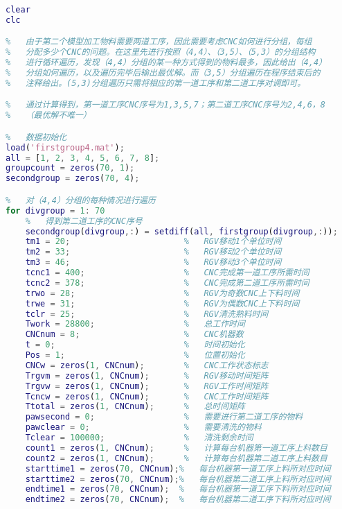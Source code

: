 \documentclass[no-math,withoutpreface,bwprint]{cumcmthesis} %
\numberwithin{equation}{section}
\numberwithin{figure}{section}
\numberwithin{table}{section}
\begin{document}
\begin{lstlisting}[language=matlab]
%   MATLAB初始化
clear
clc

%   由于第二个模型加工物料需要两道工序，因此需要考虑CNC如何进行分组，每组
%   分配多少个CNC的问题。在这里先进行按照（4,4）、（3,5）、（5,3）的分组结构
%   进行循环遍历，发现（4,4）分组的某一种方式得到的物料最多，因此给出（4,4）
%   分组如何遍历，以及遍历完毕后输出最优解。而（3,5）分组遍历在程序结束后的
%   注释给出。(5,3)分组遍历只需将相应的第一道工序和第二道工序对调即可。

%   通过计算得到，第一道工序CNC序号为1,3,5,7；第二道工序CNC序号为2,4,6，8
%   （最优解不唯一）

%   数据初始化
load('firstgroup4.mat');
all = [1, 2, 3, 4, 5, 6, 7, 8];
groupcount = zeros(70, 1);
secondgroup = zeros(70, 4);

%   对（4,4）分组的每种情况进行遍历
for divgroup = 1: 70
    %   得到第二道工序的CNC序号
    secondgroup(divgroup,:) = setdiff(all, firstgroup(divgroup,:));
    tm1 = 20;                       %   RGV移动1个单位时间
    tm2 = 33;                       %   RGV移动2个单位时间
    tm3 = 46;                       %   RGV移动3个单位时间
    tcnc1 = 400;                    %   CNC完成第一道工序所需时间
    tcnc2 = 378;                    %   CNC完成第二道工序所需时间
    trwo = 28;                      %   RGV为奇数CNC上下料时间
    trwe = 31;                      %   RGV为偶数CNC上下料时间
    tclr = 25;                      %   RGV清洗熟料时间
    Twork = 28800;                  %   总工作时间
    CNCnum = 8;                     %   CNC机器数
    t = 0;                          %   时间初始化
    Pos = 1;                        %   位置初始化
    CNCw = zeros(1, CNCnum);        %   CNC工作状态标志
    Trgvm = zeros(1, CNCnum);      	%   RGV移动时间矩阵
    Trgvw = zeros(1, CNCnum);       %   RGV工作时间矩阵
    Tcncw = zeros(1, CNCnum);       %   CNC工作时间矩阵
    Ttotal = zeros(1, CNCnum);      %   总时间矩阵
    pawsecond = 0;                  %   需要进行第二道工序的物料
    pawclear = 0;                   %   需要清洗的物料
    Tclear = 100000;                %   清洗剩余时间
    count1 = zeros(1, CNCnum);      %   计算每台机器第一道工序上料数目
    count2 = zeros(1, CNCnum);      %   计算每台机器第二道工序上料数目
    starttime1 = zeros(70, CNCnum);%   每台机器第一道工序上料所对应时间
    starttime2 = zeros(70, CNCnum);%   每台机器第二道工序上料所对应时间
    endtime1 = zeros(70, CNCnum);  %   每台机器第一道工序下料所对应时间
    endtime2 = zeros(70, CNCnum);  %   每台机器第二道工序下料所对应时间
    

\end{lstlisting}
\end{document}
